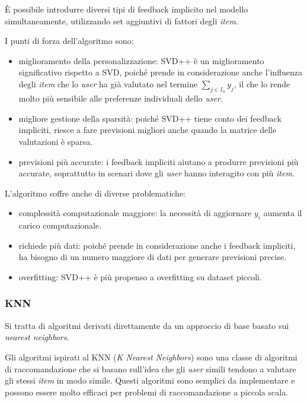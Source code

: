 È possibile introdurre diversi tipi di feedback implicito nel modello simultaneamente, utilizzando set aggiuntivi di fattori degli \textit{item}.

I punti di forza dell'algoritmo sono:

\begin{itemize}
    \item miglioramento della personalizzazione: SVD++ è un miglioramento significativo rispetto a SVD, poiché prende in considerazione anche l'influenza degli \textit{item} che lo \textit{user} ha già valutato nel termine $\sum_{j \in I_u} y_j$, il che lo rende molto più sensibile alle preferenze individuali dello \textit{user}.
    \item migliore gestione della sparsità: poiché SVD++ tiene conto dei feedback impliciti, riesce a fare previsioni migliori anche quando la matrice delle valutazioni è sparsa.
    \item previsioni più accurate: i feedback impliciti aiutano a produrre previsioni più accurate, soprattutto in scenari dove gli \textit{user} hanno interagito con più \textit{item}.
\end{itemize}

L'algoritmo soffre anche di diverse problematiche:

\begin{itemize}
    \item complessità computazionale maggiore: la necessità di aggiornare $y_i$ aumenta il carico computazionale.
    \item richiede più dati: poiché prende in considerazione anche i feedback impliciti, ha bisogno di un numero maggiore di dati per generare previsioni precise.
    \item overfitting: SVD++ è più propenso a overfitting su dataset piccoli.
\end{itemize}


\subsubsection{KNN}\label{knn}
Si tratta di algoritmi derivati direttamente da un approccio di base basato sui \emph{nearest neighbors}.

Gli algoritmi ispirati al KNN (\emph{K Nearest Neighbors}) sono una classe di algoritmi di raccomandazione che si basano sull'idea che gli \emph{user} simili tendono a valutare gli stessi \emph{item} in modo simile. Questi algoritmi sono semplici da implementare e possono essere molto efficaci per problemi di raccomandazione a piccola scala.

